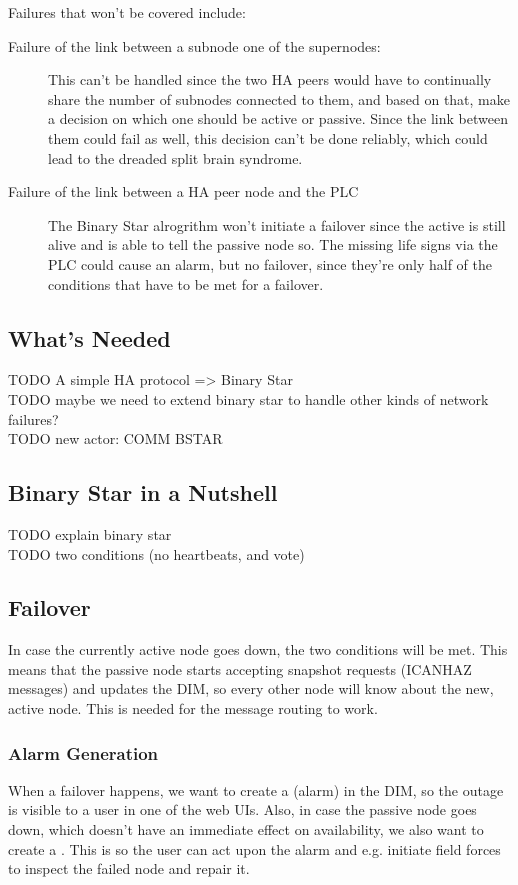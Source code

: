 Failures that won't be covered include:
\begin{description}
	\item [Failure of the link between a subnode one of the supernodes:]

		This can't be handled since the two HA peers would have to
		continually share the number of subnodes connected to them, and
		based on that, make a decision on which one should be active or
		passive. Since the link between them could fail as well, this
		decision can't be done reliably, which could lead to the
		dreaded split brain syndrome.

	\item [Failure of the link between a HA peer node and the PLC]
		The Binary Star alrogrithm won't initiate a failover since the
		active is still alive and is able to tell the passive node so.
		The missing life signs via the PLC could cause an alarm, but no
		failover, since they're only half of the conditions that have
		to be met for a failover.
\end{description}

\subsection{What's Needed}
TODO A simple HA protocol => Binary Star\\
TODO maybe we need to extend binary star to handle other kinds of network failures?\\
TODO new actor: COMM BSTAR\\

\subsection{Binary Star in a Nutshell}
TODO explain binary star\\
TODO two conditions (no heartbeats, and vote)\\

\subsection{Failover}
In case the currently active node goes down, the two conditions will be met.
This means that the passive node starts accepting snapshot requests (ICANHAZ
messages) and updates the DIM, so every other node will know about the new,
active node. This is needed for the message routing to work.

\subsubsection{Alarm Generation}
When a failover happens, we want to create a  (alarm) in the DIM, so
the outage is visible to a user in one of the web UIs. Also, in case the
passive node goes down, which doesn't have an immediate effect on availability,
we also want to create a . This is so the user can act upon the alarm
and e.g. initiate field forces to inspect the failed node and repair it.

